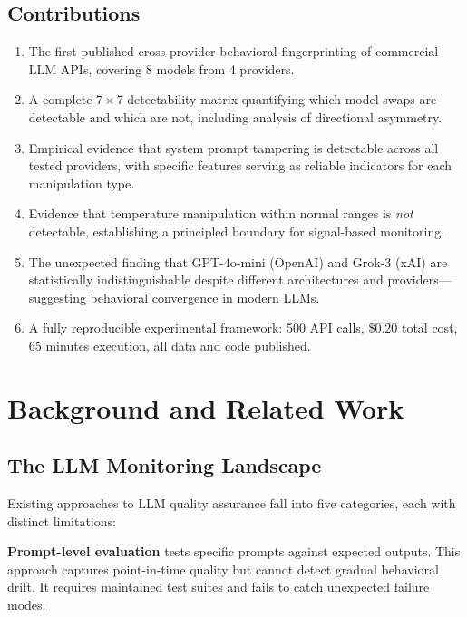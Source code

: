 \documentclass[11pt,twocolumn]{article}
\begin{document}
\subsection{Contributions}

\begin{enumerate}[nosep]
    \item The first published cross-provider behavioral fingerprinting of commercial LLM APIs, covering 8 models from 4 providers.
    \item A complete $7 \times 7$ detectability matrix quantifying which model swaps are detectable and which are not, including analysis of directional asymmetry.
    \item Empirical evidence that system prompt tampering is detectable across all tested providers, with specific features serving as reliable indicators for each manipulation type.
    \item Evidence that temperature manipulation within normal ranges is \emph{not} detectable, establishing a principled boundary for signal-based monitoring.
    \item The unexpected finding that GPT-4o-mini (OpenAI) and Grok-3 (xAI) are statistically indistinguishable despite different architectures and providers---suggesting behavioral convergence in modern LLMs.
    \item A fully reproducible experimental framework: 500 API calls, \$0.20 total cost, 65 minutes execution, all data and code published.
\end{enumerate}

\section{Background and Related Work}
\label{sec:background}

\subsection{The LLM Monitoring Landscape}

Existing approaches to LLM quality assurance fall into five categories, each with distinct limitations:

\textbf{Prompt-level evaluation} tests specific prompts against expected outputs.
This approach captures point-in-time quality but cannot detect gradual behavioral drift.
It requires maintained test suites and fails to catch unexpected failure modes.
\end{document}

